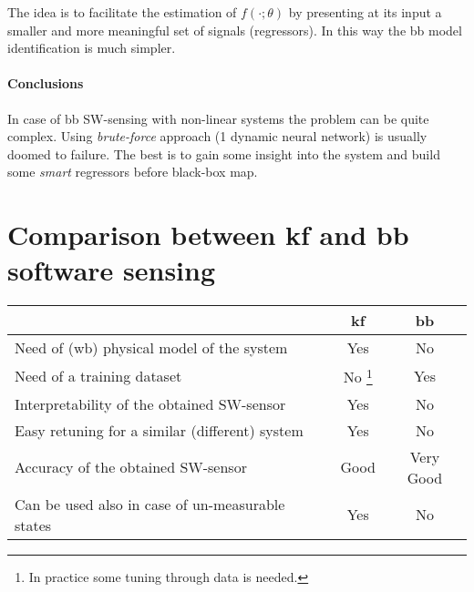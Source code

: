 The idea is to facilitate the estimation of $f(\cdot; \theta)$ by presenting at its input a smaller and more meaningful set of signals (regressors). In this way the \gls{bb} model identification is much simpler.

\paragraph{Conclusions} In case of \gls{bb} SW-sensing with non-linear systems the problem can be quite complex.
Using \emph{brute-force} approach (1 dynamic neural network) is usually doomed to failure.
The best is to gain some insight into the system and build some \emph{smart} regressors before black-box map.

\section{Comparison between \gls{kf} and \gls{bb} software sensing}

\begin{center}
	\begin{minipage}{\textwidth}
	\renewcommand{\arraystretch}{1.5}
	    \begin{tabular}{l|c|c}
	        & \textbf{\gls{kf}} & \textbf{\gls{bb}} \\
	        \hline\hline 
	        Need of (\gls{wb}) physical model of the system & \color{red} Yes & \color{green} No \\ \hline 
	        Need of a training dataset & \color{green} No {\color{black} \footnote{In practice some tuning through data is needed.}} & \color{red} Yes \\ \hline 
	        Interpretability of the obtained SW-sensor & \color{green} Yes & \color{red} No \\ \hline 
	        Easy retuning for a similar (different) system & \color{green} Yes & \color{red} No \\ \hline 
	        Accuracy of the obtained SW-sensor & \color{green} Good & \color{green} Very Good \\ \hline 
	        Can be used also in case of un-measurable states & \color{green} Yes & \color{red} No \\ \hline\hline 
	    \end{tabular}
    \end{minipage}
\end{center}

